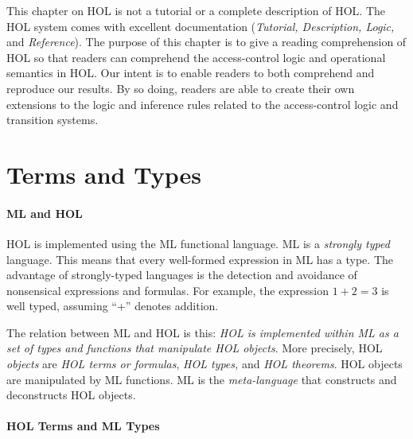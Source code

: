 This chapter on HOL is not a tutorial or a complete description of
HOL. The HOL system comes with excellent documentation
(\emph{Tutorial, Description, Logic,} and \emph{Reference}). The
purpose of this chapter is to give a reading comprehension of HOL so
that readers can comprehend the access-control logic and operational
semantics in HOL. Our intent is to enable readers to both comprehend
and reproduce our results. By so doing, readers are able to create
their own extensions to the logic and inference rules related to the
access-control logic and transition systems.

\section{Terms and Types}
\label{sec:terms-types}

\paragraph*{ML and HOL}

HOL is implemented using the ML functional language. ML is a
\emph{strongly typed} language.  This means that every well-formed
expression in ML has a type. The advantage of strongly-typed languages
is the detection and avoidance of nonsensical expressions and
formulas.  For example, the expression $1 + 2 = 3$ is well typed,
assuming ``+'' denotes addition.

The relation between ML and HOL is this: \emph{HOL is implemented
  within ML as a set of types and functions that manipulate HOL
  objects}. More precisely, HOL \emph{objects} are \emph{HOL terms or
  formulas}, \emph{HOL types,} and \emph{HOL theorems}. HOL objects
are manipulated by ML functions. ML is the \emph{meta-language} that
constructs and deconstructs HOL objects.

\paragraph*{HOL Terms and ML Types}

